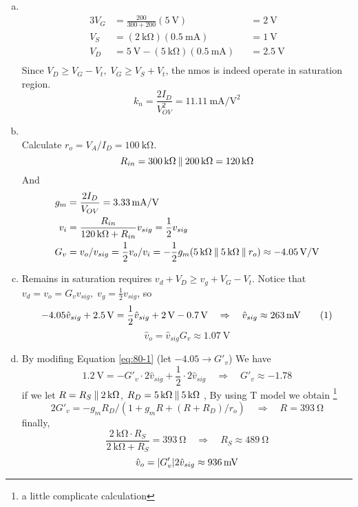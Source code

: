 \documentclass[12pt, a4paper]{article}
\begin{document}
\begin{enumerate}[(a)]
  \item \Ans \\
    \begin{alignat*}{3}
      V_G &= \frac{200}{300+200} (\SI{5}{\V}) &&= \SI{2}{\V} \\
      V_S &= (\SI{2}{\kohm}) (\SI{0.5}{\mA}) &&= \SI{1}{\V} \\
      V_D &= \SI{5}{\V} - (\SI{5}{\kohm}) (\SI{0.5}{\mA}) &&= \SI{2.5}{\V} \\
    \end{alignat*}
    Since $V_D \geq V_G - V_t, \; V_G \geq V_S + V_t$, the nmos is indeed operate in saturation region.
    \[
      k_n = \frac{2 I_D}{V_{OV}^2} = \SI{11.11}{\mA\per\V\squared}
    \]
  \item \Ans \\
    Calculate $r_o = V_A / I_D = \SI{100}{\kohm}$.
    \[
      R_{in} = \SI{300}{\kohm} \paral \SI{200}{\kohm} = \SI{120}{\kohm} \]
    And
    \begin{align*}
      g_m &= \frac{2 I_D}{V_{OV}} = \SI{3.33}{\mA\per\V} \\
      v_{i} &= \frac{R_{in}}{\SI{120}{\kohm} + R_{in}} v_{sig} = \frac{1}{2} v_{sig}  \\
      G_v &= v_o / v_{sig} = \frac{1}{2} v_o / v_i = -\frac{1}{2} g_m (\SI{5}{\kohm} \paral \SI{5}{\kohm} \paral r_o) \approx \SI{-4.05}{\V\per\V} \\
    \end{align*}
  \item 
    Remains in saturation requires $v_d + V_D \geq v_g + V_G - V_{t}$. Notice that \\ $v_d = v_o = G_v v_{sig}, \; v_g = \frac{1}{2} v_{sig}$, so
    \[
      -4.05 \hat{v}_{sig} + \SI{2.5}{\V} = \frac{1}{2} \hat{v}_{sig} + \SI{2}{\V} - \SI{0.7}{\V} \quad \Rightarrow \quad 
      \hat{v}_{sig} \approx \SI{263}{\mV} \numeq \label{eq:80-1}
    \]
    \[
      \hat{v}_{o} = \hat{v}_{sig} G_v \approx \SI{1.07}{\V}
    \]
  \item 
    By modifing Equation \eqref{eq:80-1} (let $-4.05 \rightarrow G'_v$)
    We have
    \[
     \SI{1.2}{\V} = -G'_v \cdot 2\hat{v}_{sig} + \frac{1}{2} \cdot 2\hat{v}_{sig} \quad \Rightarrow \quad G'_v \approx -1.78
    \]
    if we let $R = R_S \paral \SI{2}{\kohm}$, $R_D = \SI{5}{\kohm} \paral \SI{5}{\kohm}$
    , By using T model we obtain \footnote{a little complicate calculation}
    \[
      2G'_v = -g_m R_D/ (1 + g_mR + (R+R_D)/r_o) \quad \Rightarrow \quad
      R = \SI{393}{\ohm}
    \]
    finally,
    \[
      \frac{\SI{2}{\kohm} \cdot R_S}{\SI{2}{\kohm} + R_S } = \SI{393}{\ohm}
      \quad \Rightarrow \quad R_S \approx \SI{489}{\ohm}
    \]
    \[
      \hat{v}_o = \abs{G'_v} 2\hat{v}_{sig} \approx  \SI{936}{\mV}
    \]
    
\end{enumerate}
\end{document}
